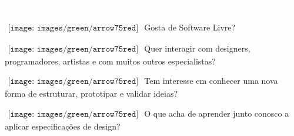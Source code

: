 
\newcommand{\QuestionEntry}[1]{
	$\begin{array}{l}
	{\texttt{[image: images/green/arrow75red]}}
	\end{array}
	$ #1
}

\LARGE
\noindent\colorbox{materialRed}
{\parbox[c][25pt][c]{\textwidth}{\hspace{15pt}\textcolor{white}{Por que participar?}}} %

\large
\vspace*{10pt}
\QuestionEntry{Gosta de Software Livre?}

\QuestionEntry{Quer interagir com designers, programadores, artistas e com muitos outros especialistas?}

\QuestionEntry{Tem interesse em conhecer uma nova forma de estruturar, prototipar e validar ideias?}

\QuestionEntry{O que acha de aprender junto conosco a aplicar especificações de design?}


\vspace*{5pt}

